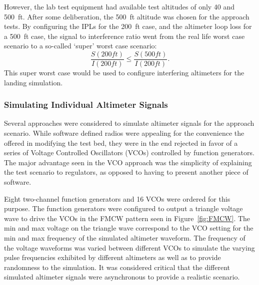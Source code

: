 However, the lab test equipment had available test altitudes of only 40 and 500~ft. After some deliberation, the 500~ft altitude was chosen for the approach tests. By configuring the IPLs for the 200~ft case, and the altimeter loop loss for a 500~ft case, the signal to interference ratio went from the real life worst case scenario to a so-called `super' worst case scenario: $$\frac{S(200ft)}{I(200ft)}\leq\frac{S(500ft)}{I(200ft)}.$$
This super worst case would be used to configure interfering altimeters for the landing simulation.


\subsubsection{Simulating Individual Altimeter Signals}
Several approaches were considered to simulate altimeter signals for the approach scenario. While software defined radios were appealing for the convenience the offered in modifying the test bed, they were in the end rejected in favor of a series of Voltage Controlled Oscillators (VCOs) controlled by function generators. The major advantage seen in the VCO approach was the simplicity of explaining the test scenario to regulators, as opposed to having to present another piece of software.

Eight two-channel function generators and 16 VCOs were ordered for this purpose. The function generators were configured to output a triangle voltage wave to drive the VCOs in the FMCW pattern seen in Figure~\ref{fig:FMCW}. The min and max voltage on the triangle wave correspond to the VCO setting for the min and max frequency of the simulated altimeter waveform. The frequency of the voltage waveforms was varied between different VCOs to simulate the varying pulse frequencies exhibited by different altimeters as well as to provide randomness to the simulation. It was considered critical that the different simulated altimeter signals were asynchronous to provide a realistic scenario. 


